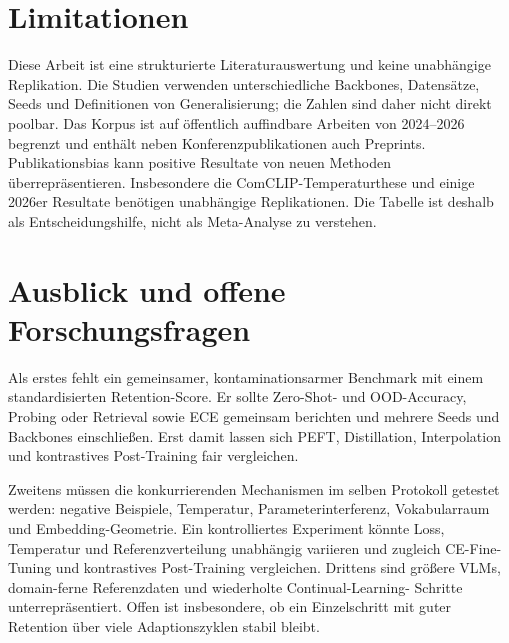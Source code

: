 \documentclass[conference]{IEEEtran}
\begin{document}
\section{Limitationen}
Diese Arbeit ist eine strukturierte Literaturauswertung und keine unabhängige
Replikation. Die Studien verwenden unterschiedliche Backbones, Datensätze,
Seeds und Definitionen von Generalisierung; die Zahlen sind daher nicht
direkt poolbar. Das Korpus ist auf öffentlich auffindbare Arbeiten von
2024--2026 begrenzt und enthält neben Konferenzpublikationen auch Preprints.
Publikationsbias kann positive Resultate von neuen Methoden überrepräsentieren.
Insbesondere die ComCLIP-Temperaturthese und einige 2026er Resultate benötigen
unabhängige Replikationen. Die Tabelle ist deshalb als Entscheidungshilfe,
nicht als Meta-Analyse zu verstehen.

\section{Ausblick und offene Forschungsfragen}
Als erstes fehlt ein gemeinsamer, kontaminationsarmer Benchmark mit einem
standardisierten Retention-Score. Er sollte Zero-Shot- und OOD-Accuracy,
Probing oder Retrieval sowie ECE gemeinsam berichten und mehrere Seeds und
Backbones einschließen. Erst damit lassen sich PEFT, Distillation,
Interpolation und kontrastives Post-Training fair vergleichen.

Zweitens müssen die konkurrierenden Mechanismen im selben Protokoll getestet
werden: negative Beispiele, Temperatur, Parameterinterferenz,
Vokabularraum und Embedding-Geometrie. Ein kontrolliertes Experiment könnte
Loss, Temperatur und Referenzverteilung unabhängig variieren und zugleich
CE-Fine-Tuning und kontrastives Post-Training vergleichen. Drittens sind
größere VLMs, domain-ferne Referenzdaten und wiederholte Continual-Learning-
Schritte unterrepräsentiert. Offen ist insbesondere, ob ein Einzelschritt mit
guter Retention über viele Adaptionszyklen stabil bleibt.
\end{document}
